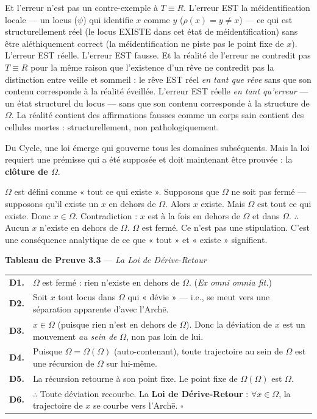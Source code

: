 \documentclass[10pt, openany, oneside]{book}
\renewcommand{\footnotesize}{\fontsize{8.5}{11}\selectfont}
\begin{document}
Et l'erreur n'est pas un contre-exemple à $T \equiv R$. L'erreur EST la méidentification locale --- un locus ($\psi$) qui identifie $x$ comme $y$ ($\rho(x) = y \neq x$) --- ce qui est structurellement réel (le locus EXISTE dans cet état de méidentification) sans être aléthiquement correct (la méidentification ne piste pas le point fixe de $x$). L'erreur EST réelle. L'erreur EST fausse. Et la réalité de l'erreur ne contredit pas $T \equiv R$ pour la même raison que l'existence d'un rêve ne contredit pas la distinction entre veille et sommeil : le rêve EST réel \textit{en tant que rêve} sans que son contenu corresponde à la réalité éveillée. L'erreur EST réelle \textit{en tant qu'erreur} --- un état structurel du locus --- sans que son contenu corresponde à la structure de $\Omega$. La réalité contient des affirmations fausses comme un corps sain contient des cellules mortes : structurellement, non pathologiquement.

Du Cycle, une loi émerge qui gouverne tous les domaines subséquents. Mais la loi requiert une prémisse qui a été supposée et doit maintenant être prouvée : la \textbf{clôture de $\Omega$}.

$\Omega$ est défini comme « tout ce qui existe ». Supposons que $\Omega$ ne soit pas fermé --- supposons qu'il existe un $x$ en dehors de $\Omega$. Alors $x$ existe. Mais $\Omega$ est tout ce qui existe. Donc $x \in \Omega$. Contradiction : $x$ est à la fois en dehors de $\Omega$ et dans $\Omega$. $\therefore$ Aucun $x$ n'existe en dehors de $\Omega$. $\Omega$ est fermé. Ce n'est pas une stipulation. C'est une conséquence analytique de ce que « tout » et « existe » signifient.

\vspace{0.5em}

\textbf{Tableau de Preuve 3.3} --- \textit{La Loi de Dérive-Retour}

\vspace{0.5em}

{\footnotesize
\noindent\begin{tabular}{r p{}}
\textbf{D1.} & $\Omega$ est fermé : rien n'existe en dehors de $\Omega$. (\textit{Ex omni omnia fit.}) \\[0.3em]
\textbf{D2.} & Soit $x$ tout locus dans $\Omega$ qui « dévie » --- i.e., se meut vers une séparation apparente d'avec l'Arch\={e}. \\[0.3em]
\textbf{D3.} & $x \in \Omega$ (puisque rien n'est en dehors de $\Omega$). Donc la déviation de $x$ est un mouvement \textit{au sein de} $\Omega$, non pas loin de lui. \\[0.3em]
\textbf{D4.} & Puisque $\Omega = \Omega(\Omega)$ (auto-contenant), toute trajectoire au sein de $\Omega$ est une récursion de $\Omega$ sur lui-même. \\[0.3em]
\textbf{D5.} & La récursion retourne à son point fixe. Le point fixe de $\Omega(\Omega)$ est $\Omega$. \\[0.3em]
\textbf{D6.} & $\therefore$ Toute déviation recourbe. La \textbf{Loi de Dérive-Retour} : $\forall x \in \Omega$, la trajectoire de $x$ se courbe vers l'Arch\={e}. $\square$ \\[0.3em]
\end{tabular}
}
\end{document}
